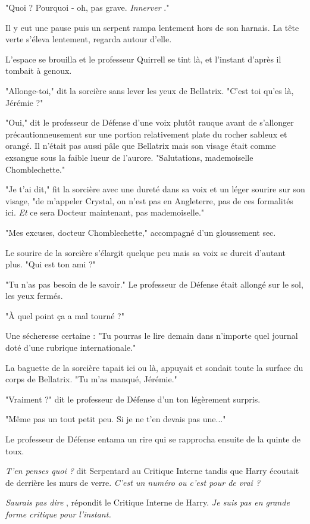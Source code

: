 "Quoi ? Pourquoi - oh, pas grave. \emph{Innerver} ."

Il y eut une pause puis un serpent rampa lentement hors de son harnais. La tête verte s'éleva lentement, regarda autour d'elle.

L'espace se brouilla et le professeur Quirrell se tint là, et l'instant d'après il tombait à genoux.

"Allonge-toi," dit la sorcière sans lever les yeux de Bellatrix. "C'est toi qu'es là, Jérémie ?"

"Oui," dit le professeur de Défense d'une voix plutôt rauque avant de s'allonger précautionneusement sur une portion relativement plate du rocher sableux et orangé. Il n'était pas aussi pâle que Bellatrix mais son visage était comme exsangue sous la faible lueur de l'aurore. "Salutations, mademoiselle Chomblechette."

"Je t'ai dit," fit la sorcière avec une dureté dans sa voix et un léger sourire sur son visage, "de m'appeler Crystal, on n'est pas en Angleterre, pas de ces formalités ici. \emph{Et}  ce sera Docteur maintenant, pas mademoiselle."

"Mes excuses, docteur Chomblechette," accompagné d'un gloussement sec.

Le sourire de la sorcière s'élargit quelque peu mais sa voix se durcit d'autant plus. "Qui est ton ami ?"

"Tu n'as pas besoin de le savoir." Le professeur de Défense était allongé sur le sol, les yeux fermés.

"À quel point ça a mal tourné ?"

Une sécheresse certaine : "Tu pourras le lire demain dans n'importe quel journal doté d'une rubrique internationale."

La baguette de la sorcière tapait ici ou là, appuyait et sondait toute la surface du corps de Bellatrix. "Tu m'as manqué, Jérémie."

"Vraiment ?" dit le professeur de Défense d'un ton légèrement surpris.

"Même pas un tout petit peu. Si je ne t'en devais pas une..."

Le professeur de Défense entama un rire qui se rapprocha ensuite de la quinte de toux.

\emph{T'en penses quoi ?}  dit Serpentard au Critique Interne tandis que Harry écoutait de derrière les murs de verre. \emph{C'est un numéro ou c'est pour de vrai ?} 

\emph{Saurais pas dire} , répondit le Critique Interne de Harry. \emph{Je suis pas en grande forme critique pour l'instant.} 

